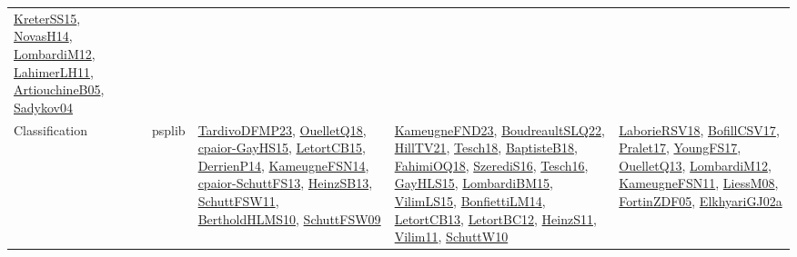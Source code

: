 {\begin{longtable}{lp{3cm}>{\raggedright}p{6cm}>{\raggedright}p{6cm}p{8cm}}
\href{papers/KreterSS15.pdf}{KreterSS15}\cite{KreterSS15}, \href{articles/NovasH14.pdf}{NovasH14}\cite{NovasH14}, \href{articles/LombardiM12.pdf}{LombardiM12}\cite{LombardiM12}, \href{papers/LahimerLH11.pdf}{LahimerLH11}\cite{LahimerLH11}, \href{papers/ArtiouchineB05.pdf}{ArtiouchineB05}\cite{ArtiouchineB05}, \href{papers/Sadykov04.pdf}{Sadykov04}\cite{Sadykov04}\\
Classification & psplib & \href{papers/TardivoDFMP23.pdf}{TardivoDFMP23}\cite{TardivoDFMP23}, \href{papers/OuelletQ18.pdf}{OuelletQ18}\cite{OuelletQ18}, \href{papers/cpaior-GayHS15.pdf}{cpaior-GayHS15}\cite{cpaior-GayHS15}, \href{articles/LetortCB15.pdf}{LetortCB15}\cite{LetortCB15}, \href{papers/DerrienP14.pdf}{DerrienP14}\cite{DerrienP14}, \href{articles/KameugneFSN14.pdf}{KameugneFSN14}\cite{KameugneFSN14}, \href{papers/cpaior-SchuttFS13.pdf}{cpaior-SchuttFS13}\cite{cpaior-SchuttFS13}, \href{articles/HeinzSB13.pdf}{HeinzSB13}\cite{HeinzSB13}, \href{articles/SchuttFSW11.pdf}{SchuttFSW11}\cite{SchuttFSW11}, \href{papers/BertholdHLMS10.pdf}{BertholdHLMS10}\cite{BertholdHLMS10}, \href{papers/SchuttFSW09.pdf}{SchuttFSW09}\cite{SchuttFSW09} & \href{papers/KameugneFND23.pdf}{KameugneFND23}\cite{KameugneFND23}, \href{papers/BoudreaultSLQ22.pdf}{BoudreaultSLQ22}\cite{BoudreaultSLQ22}, \href{papers/HillTV21.pdf}{HillTV21}\cite{HillTV21}, \href{papers/Tesch18.pdf}{Tesch18}\cite{Tesch18}, \href{articles/BaptisteB18.pdf}{BaptisteB18}\cite{BaptisteB18}, \href{articles/FahimiOQ18.pdf}{FahimiOQ18}\cite{FahimiOQ18}, \href{papers/SzerediS16.pdf}{SzerediS16}\cite{SzerediS16}, \href{papers/Tesch16.pdf}{Tesch16}\cite{Tesch16}, \href{papers/GayHLS15.pdf}{GayHLS15}\cite{GayHLS15}, \href{papers/LombardiBM15.pdf}{LombardiBM15}\cite{LombardiBM15}, \href{papers/VilimLS15.pdf}{VilimLS15}\cite{VilimLS15}, \href{papers/BonfiettiLM14.pdf}{BonfiettiLM14}\cite{BonfiettiLM14}, \href{papers/LetortCB13.pdf}{LetortCB13}\cite{LetortCB13}, \href{papers/LetortBC12.pdf}{LetortBC12}\cite{LetortBC12}, \href{papers/HeinzS11.pdf}{HeinzS11}\cite{HeinzS11}, \href{papers/Vilim11.pdf}{Vilim11}\cite{Vilim11}, \href{papers/SchuttW10.pdf}{SchuttW10}\cite{SchuttW10} & \href{articles/LaborieRSV18.pdf}{LaborieRSV18}\cite{LaborieRSV18}, \href{papers/BofillCSV17.pdf}{BofillCSV17}\cite{BofillCSV17}, \href{papers/Pralet17.pdf}{Pralet17}\cite{Pralet17}, \href{papers/YoungFS17.pdf}{YoungFS17}\cite{YoungFS17}, \href{papers/OuelletQ13.pdf}{OuelletQ13}\cite{OuelletQ13}, \href{articles/LombardiM12.pdf}{LombardiM12}\cite{LombardiM12}, \href{papers/KameugneFSN11.pdf}{KameugneFSN11}\cite{KameugneFSN11}, \href{articles/LiessM08.pdf}{LiessM08}\cite{LiessM08}, \href{papers/FortinZDF05.pdf}{FortinZDF05}\cite{FortinZDF05}, \href{papers/ElkhyariGJ02a.pdf}{ElkhyariGJ02a}\cite{ElkhyariGJ02a}\\

\end{longtable}}
